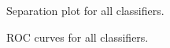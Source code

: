 \documentclass{article}
\begin{document}
\begin{figure}[H]
    \caption{Separation plot for all classifiers.}
\label{fig:separation}
\end{figure}

\begin{figure}[H]
    \caption{ROC curves for all classifiers.}
\end{figure}
\end{document}
